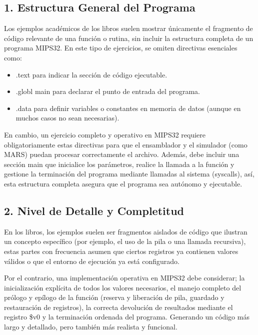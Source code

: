 \documentclass[12pt, letterpaper]{article}
\begin{document}
\subsection*{1. Estructura General del Programa}

Los ejemplos académicos de los libros suelen mostrar únicamente el fragmento de código relevante de una función o rutina, sin incluir la estructura completa de un programa MIPS32. En este tipo de ejercicios, se omiten directivas esenciales como:

\begin{itemize}
    \item .text para indicar la sección de código ejecutable.
    \item .globl main para declarar el punto de entrada del programa.
    \item .data para definir variables o constantes en memoria de datos (aunque en muchos casos no sean necesarias).
\end{itemize}

En cambio, un ejercicio completo y operativo en MIPS32 requiere obligatoriamente estas directivas para que el ensamblador y el simulador (como MARS) puedan procesar correctamente el archivo. Además, debe incluir una sección main que inicialice los parámetros, realice la llamada a la función y gestione la terminación del programa mediante llamadas al sistema (syscalls), así, esta estructura completa asegura que el programa sea autónomo y ejecutable.

\subsection*{2. Nivel de Detalle y Completitud}

En los libros, los ejemplos suelen ser fragmentos aislados de código que ilustran un concepto específico (por ejemplo, el uso de la pila o una llamada recursiva), estas partes con frecuencia asumen que ciertos registros ya contienen valores válidos o que el entorno de ejecución ya está configurado.

Por el contrario, una implementación operativa en MIPS32 debe considerar; la inicialización explícita de todos los valores necesarios, el manejo completo del prólogo y epílogo de la función (reserva y liberación de pila, guardado y restauración de registros), la correcta devolución de resultados mediante el registro \$v0 y la terminación ordenada del programa. Generando un código más largo y detallado, pero también más realista y funcional.
\end{document}
